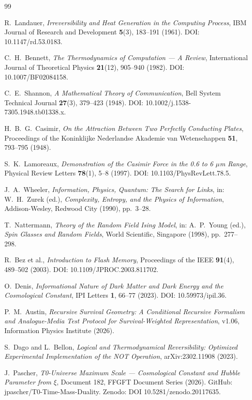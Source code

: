 \begin{thebibliography}{99}

R.~Landauer,
\textit{Irreversibility and Heat Generation in the Computing Process},
IBM Journal of Research and Development \textbf{5}(3), 183--191 (1961).
DOI: 10.1147/rd.53.0183.

C.~H.~Bennett,
\textit{The Thermodynamics of Computation — A Review},
International Journal of Theoretical Physics \textbf{21}(12), 905--940 (1982).
DOI: 10.1007/BF02084158.

C.~E.~Shannon,
\textit{A Mathematical Theory of Communication},
Bell System Technical Journal \textbf{27}(3), 379--423 (1948).
DOI: 10.1002/j.1538-7305.1948.tb01338.x.

H.~B.~G.~Casimir,
\textit{On the Attraction Between Two Perfectly Conducting Plates},
Proceedings of the Koninklijke Nederlandse Akademie van Wetenschappen
\textbf{51}, 793--795 (1948).

S.~K.~Lamoreaux,
\textit{Demonstration of the Casimir Force in the 0.6 to 6 $\mu$m Range},
Physical Review Letters \textbf{78}(1), 5--8 (1997).
DOI: 10.1103/PhysRevLett.78.5.

J.~A.~Wheeler,
\textit{Information, Physics, Quantum: The Search for Links},
in: W.~H.~Zurek (ed.), \textit{Complexity, Entropy, and the Physics of
Information}, Addison-Wesley, Redwood City (1990), pp.~3--28.

T.~Nattermann,
\textit{Theory of the Random Field Ising Model},
in: A.~P.~Young (ed.), \textit{Spin Glasses and Random Fields},
World Scientific, Singapore (1998), pp.~277--298.

R.~Bez et al.,
\textit{Introduction to Flash Memory},
Proceedings of the IEEE \textbf{91}(4), 489--502 (2003).
DOI: 10.1109/JPROC.2003.811702.

O.~Denis,
\textit{Informational Nature of Dark Matter and Dark Energy and the
Cosmological Constant},
IPI Letters \textbf{1}, 66--77 (2023).
DOI: 10.59973/ipil.36.

P.~M.~Austin,
\textit{Recursive Survival Geometry: A Conditional Recursive Formalism
and Analogue-Media Test Protocol for Survival-Weighted Representation},
v1.06, Information Physics Institute (2026).

S.~Dago and L.~Bellon,
\textit{Logical and Thermodynamical Reversibility: Optimized Experimental
Implementation of the NOT Operation},
arXiv:2302.11908 (2023).

J.~Pascher,
\textit{T0-Universe Maximum Scale — Cosmological Constant and Hubble
Parameter from $\xi$},
Document 182, FFGFT Document Series (2026).
GitHub: jpascher/T0-Time-Mass-Duality.
Zenodo: DOI 10.5281/zenodo.20117635.

\end{thebibliography}
